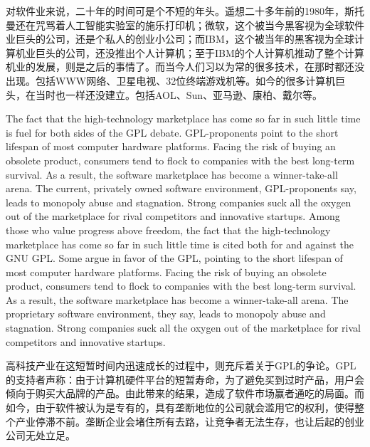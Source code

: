 \ifdefined\chs
对软件业来说，二十年的时间可是个不短的年头。遥想二十多年前的1980年，斯托曼还在咒骂着人工智能实验室的施乐打印机；微软，这个被当今黑客视为全球软件业巨头的公司，还是个私人的创业小公司；而IBM，这个被当年的黑客视为全球计算机业巨头的公司，还没推出个人计算机；至于IBM的个人计算机推动了整个计算机业的发展，则是之后的事情了。而当今人们习以为常的很多技术，在那时都还没出现。包括WWW网络、卫星电视、32位终端游戏机等。如今的很多计算机巨头，在当时也一样还没建立。包括AOL、Sun、亚马逊、康柏、戴尔等。
\fi

\ifdefined\eng
\ifdefined\vone
The fact that the high-technology marketplace has come so far in such little time is fuel for both sides of the GPL debate. GPL-proponents point to the short lifespan of most computer hardware platforms. Facing the risk of buying an obsolete product, consumers tend to flock to companies with the best long-term survival. As a result, the software marketplace has become a winner-take-all arena. The current, privately owned software environment, GPL-proponents say, leads to monopoly abuse and stagnation. Strong companies suck all the oxygen out of the marketplace for rival competitors and innovative startups.
\fi
\ifdefined\vtwo
Among those who value progress above freedom, the fact that the high-technology marketplace has come so far in such little time is cited both for and against the GNU GPL.  Some argue in favor of the GPL, pointing to the short lifespan of most computer hardware platforms. Facing the risk of buying an obsolete product, consumers tend to flock to companies with the best long-term survival. As a result, the software marketplace has become a winner-take-all arena. The proprietary software environment, they say, leads to monopoly abuse and stagnation. Strong companies suck all the oxygen out of the marketplace for rival competitors and innovative startups.
\fi
\fi

\ifdefined\chs
高科技产业在这短暂时间内迅速成长的过程中，则充斥着关于GPL的争论。GPL的支持者声称：由于计算机硬件平台的短暂寿命，为了避免买到过时产品，用户会倾向于购买大品牌的产品。由此带来的结果，造成了软件市场赢者通吃的局面。而如今，由于软件被认为是专有的，具有垄断地位的公司就会滥用它的权利，使得整个产业停滞不前。垄断企业会堵住所有去路，让竞争者无法生存，也让后起的创业公司无处立足。
\fi

